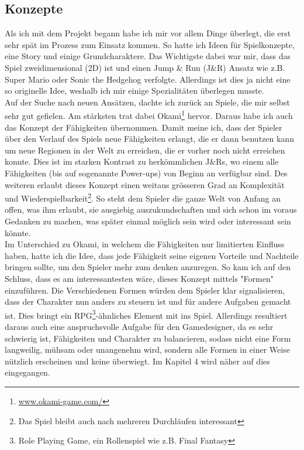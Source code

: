 \documentclass[12pt,a4paper,titlepage]{article}
\begin{document}
	\subsection{Konzepte}
		Als ich mit dem Projekt begann habe ich mir vor allem Dinge überlegt, die erst sehr spät im Prozess zum Einsatz kommen. So hatte ich Ideen für Spielkonzepte, eine Story und einige Grundcharaktere. 
		Das Wichtigste dabei war mir, dass das Spiel zweidimensional (2D) ist und einen Jump \& Run (J\&R) Ansatz wie z.B. Super Mario oder Sonic the Hedgehog verfolgte.
		Allerdings ist dies ja nicht eine so originelle Idee, weshalb ich mir einige Spezialitäten überlegen musste.\\
		
		Auf der Suche nach neuen Ansätzen, dachte ich zurück an Spiele, die mir selbst sehr gut gefielen. Am stärksten trat dabei Okami\footnote{\url{www.okami-game.com/}} hervor. Daraus habe ich auch das Konzept der Fähigkeiten übernommen. Damit meine ich, dass der Spieler über den Verlauf des Spiels neue Fähigkeiten erlangt, die er dann benutzen kann um neue Regionen in der Welt zu erreichen, die er vorher noch nicht erreichen konnte. Dies ist im starken Kontrast zu herkömmlichen J\&Rs, wo einem alle Fähigkeiten (bis auf sogenannte Power-ups) von Beginn an verfügbar sind. Des weiteren erlaubt dieses Konzept einen weitaus grösseren Grad an Komplexität und Wiederspielbarkeit\footnote{Das Spiel bleibt auch nach mehreren Durchläufen interessant}. So steht dem Spieler die ganze Welt von Anfang an offen, was ihm erlaubt, sie ausgiebig auszukundschaften und sich schon im voraus Gedanken zu machen, was später einmal möglich sein wird oder interessant sein könnte.\\
		
		Im Unterschied zu Okami, in welchem die Fähigkeiten nur limitierten Einfluss haben, hatte ich die Idee, dass jede Fähigkeit seine eigenen Vorteile und Nachteile bringen sollte, um den Spieler mehr zum denken anzuregen. So kam ich auf den Schluss, dass es am interessantesten wäre, dieses Konzept mittels "Formen" einzuführen. Die Verschiedenen Formen würden dem Spieler klar signalisieren, dass der Charakter nun anders zu steuern ist und für andere Aufgaben gemacht ist. Dies bringt ein RPG\footnote{Role Playing Game, ein Rollenspiel wie z.B. Final Fantasy}-ähnliches Element mit ins Spiel. Allerdings resultiert daraus auch eine anspruchsvolle Aufgabe für den Gamedesigner, da es sehr schwierig ist, Fähigkeiten und Charakter zu balancieren, sodass nicht eine Form langweilig, mühsam oder unangenehm wird, sondern alle Formen in einer Weise nützlich erscheinen und keine überwiegt. Im Kapitel 4 wird näher auf dies eingegangen.\\
		
\end{document}
